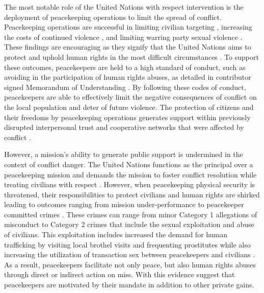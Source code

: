 \documentclass[12pt]{article}
\newcommand{\UN}[1]{United Nations}
\newcommand{\PKOs}[1]{peacekeeping operations}
\begin{document}
The most notable role of the \UN{} with respect intervention is the deployment of \PKOs{} to limit the spread of conflict. Peacekeeping operations are successful in limiting civilian targeting \citep{hultman2013united}, increasing the costs of continued violence \citep{hultman2014beyond}, and limiting warring party sexual violence \citep{johansson2019peacekeeping}. These findings are encouraging as they signify that the \UN{} aims to protect and uphold human rights in the most difficult circumstances \citep{howland2006peacekeeping}. To support these outcomes, peacekeepers are held to a high standard of conduct, such as avoiding in the participation of human rights abuses, as detailed in contributor signed Memorandum of Understanding \citep{MOU}. By following these codes of conduct, peacekeepers are able to effectively limit the negative consequences of conflict on the local population and deter of future violence. The protection of citizens and their freedoms by \PKOs{} generates support within previously disrupted interpersonal trust and cooperative networks that were affected by conflict \citep{goldsmith2012trust}. 

However, a mission's ability to generate public support is undermined in the context of conflict danger. The \UN{} functions as the principal over a peacekeeping mission and demands the mission to foster conflict resolution while treating civilians with respect \citep{kanetake2010whose}. However, when peacekeeping physical security is threatened, their responsibilities to protect civilians and human rights are shirked leading to outcomes ranging from mission under-performance to peacekeeper committed crimes \citep{butler2007security,blair2021peacekeeping}. These crimes can range from minor Category 1 allegations of misconduct to Category 2 crimes that include the sexual exploitation and abuse of civilians\footnotemark[1] \citep{horne2020relationship}. This exploitation includes increased the demand for human trafficking by visiting local brothel visits and frequenting prostitutes \citep{horne2019impact,bell2018peacekeeping} while also increasing the utilization of transaction sex between peacekeepers and civilians \citep{beber2017peacekeeping}. As a result, peacekeepers facilitate not only peace, but also human rights abuses through direct or indirect action on miss. With this evidence suggest that peacekeepers are motivated by their mandate in addition to other private gains. 

\end{document}
